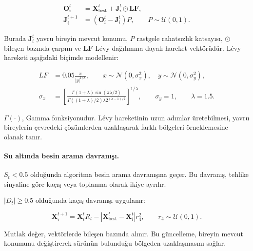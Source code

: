 \begin{align}
    \mathbf{O}_i^t
    &=
    \mathbf{X}_{\mathrm{best}}^t
    +\mathbf{J}_i^t\odot\mathbf{LF},
    \label{eq:wo_safety_position}\\
    \mathbf{J}_i^{t+1}
    &=
    \left(\mathbf{O}_i^t-\mathbf{J}_i^t\right)P,
    \qquad P\sim\mathcal{U}(0,1).
    \label{eq:wo_juvenile}
\end{align}

Burada $\mathbf{J}_i^t$ yavru bireyin mevcut konumu, $P$ rastgele
rahatsızlık katsayısı, $\odot$ bileşen bazında çarpım ve $\mathbf{LF}$
Lévy dağılımına dayalı hareket vektörüdür. Lévy hareketi aşağıdaki
biçimde modellenir:

\begin{align}
    LF
    &=
    0.05\frac{x}{|y|^{1/\lambda}},
    \qquad
    x\sim\mathcal{N}(0,\sigma_x^2),
    \quad
    y\sim\mathcal{N}(0,\sigma_y^2),
    \label{eq:wo_levy}\\
    \sigma_x
    &=
    \left[
        \frac{
            \Gamma(1+\lambda)\sin(\pi\lambda/2)
        }{
            \Gamma((1+\lambda)/2)\lambda 2^{(\lambda-1)/2}
        }
    \right]^{1/\lambda},
    \qquad
    \sigma_y=1,
    \qquad
    \lambda=1.5.
    \label{eq:wo_levy_sigma}
\end{align}

$\Gamma(\cdot)$, Gamma fonksiyonudur. Lévy hareketinin uzun adımlar
üretebilmesi, yavru bireylerin çevredeki çözümlerden uzaklaşarak farklı
bölgeleri örneklemesine olanak tanır.

\paragraph{Su altında besin arama davranışı.}

$S_t<0.5$ olduğunda algoritma besin arama davranışına geçer. Bu
davranış, tehlike sinyaline göre kaçış veya toplanma olarak ikiye
ayrılır.

$|D_t|\geq 0.5$ olduğunda kaçış davranışı uygulanır:

\begin{equation}
    \mathbf{X}_i^{t+1}
    =
    \mathbf{X}_i^t R_t
    -
    \left|
        \mathbf{X}_{\mathrm{best}}^t-\mathbf{X}_i^t
    \right|r_4^2,
    \qquad r_4\sim\mathcal{U}(0,1).
    \label{eq:wo_fleeing}
\end{equation}

Mutlak değer, vektörlerde bileşen bazında alınır. Bu güncelleme,
bireyin mevcut konumunu değiştirerek sürünün bulunduğu bölgeden
uzaklaşmasını sağlar.

